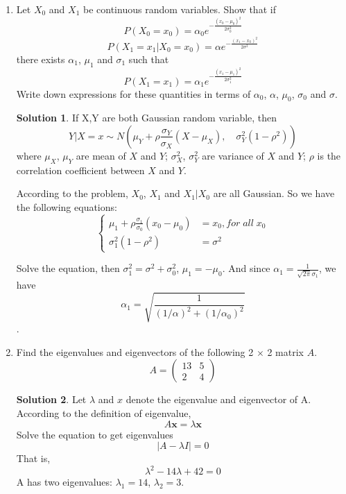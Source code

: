 \documentclass[]{book}
\theoremstyle{definition}
\newtheorem*{soln}{Solution}
\begin{document}
\begin{enumerate}
\item	Let $X_0$ and $X_1$ be continuous random variables. Show that if
	$$P(X_0=x_0) = \alpha_0	e^{-\frac{(x_0-\mu_0)^2}{2 \sigma_0^2}}$$
	$$P(X_1=x_1|X_0=x_0) = \alpha	e^{-\frac{(x_1-x_0)^2}{2 \sigma^2}}$$
there exists $\alpha_1$, $\mu_1$ and $\sigma_1$ such that
$$P(X_1=x_1) = \alpha_1	e^{-\frac{(x_1-\mu_1)^2}{2 \sigma_1^2}}$$	
Write down expressions for these quantities in terms of $\alpha_0$, $\alpha$, $\mu_0$, $\sigma_0$ and $\sigma$.

\begin{soln}
	If X,Y are both Gaussian random variable, then
	$$Y|X=x\sim N\left(\mu_Y+\rho \dfrac{\sigma_Y}{\sigma_X}(X-\mu_X),\quad \sigma^2_Y(1-\rho^2)\right)$$ 
	where $\mu_X$, $\mu_Y$ are mean of $X$ and $Y$; $\sigma_X^2$, $\sigma_Y^2$ are variance of $X$ and $Y$; $\rho$ is the correlation coefficient between $X$ and $Y$.
	
	According to the problem, $X_0$, $X_1$ and $X_1 | X_0$ are all Gaussian. So we have the following equations:
	$$ \left\{
	\begin{aligned}
	\mu_1 + \rho \frac{\sigma_1}{\sigma_0}(x_0 - \mu_0) & =  x_0 ,   for \; all \; x_0 \\ 
	\sigma_1^2  (1-\rho^2) & =  \sigma^2 
	\end{aligned} 
	\right.
	$$

	Solve the equation, then $\sigma_1^2 = \sigma^2 + \sigma_0^2$, $\mu_1 = -\mu_0$. 
	And since $\alpha_1 = \frac{1}{\sqrt{2 \pi} \sigma_1}$, we have 
	$$\alpha_1 = \sqrt{ \frac{1}{(1/\alpha)^2 + (1/\alpha_0)^2}  } $$.
	
\end{soln}

\item	Find the eigenvalues and eigenvectors of the following 2 $\times$ 2 matrix $A$.
$$A = \left({
\begin{matrix}

13 & 5 \\ 
2 & 4
\end{matrix}
}\right) $$

\begin{soln}
	Let $\lambda$ and \boldmath $x$ \unboldmath denote the eigenvalue and eigenvector of A. According to the definition of eigenvalue,
	$$A \boldsymbol{x} = \lambda \boldsymbol{x} $$
	Solve the equation to get eigenvalues
	$$ |A-\lambda I| = 0 $$
	That is,
	$$\lambda ^2 -14\lambda +42 = 0$$
	A has two eigenvalues: $\lambda_1 = 14$, $\lambda_2 = 3$.
	

\end{soln}
\end{enumerate}
\end{document}
